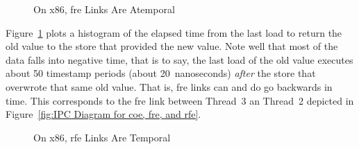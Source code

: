 \documentclass[10]{article}
\begin{document}
\begin{figure}[tb]
\begin{center}
\caption{On x86, fre Links Are Atemporal}
\label{fig:On x86, fre Links Are Atemporal}
\end{center}
\end{figure}

Figure~\ref{fig:On x86, fre Links Are Atemporal}
plots a histogram of the elapsed time from the last load to return the
old value to the store that provided the new value.
Note well that most of the data falls into negative time, that is to say,
the last load of the old value executes about 50 timestamp periods (about
20~nanoseconds) \emph{after} the store that overwrote that same old value.
That is, fre links can and do go backwards in time.
This corresponds to the fre link between Thread~3 an Thread~2 depicted in
Figure~\ref{fig:IPC Diagram for coe, fre, and rfe}.

\begin{figure}[tb]
\begin{center}
\caption{On x86, rfe Links Are Temporal}
\label{fig:On x86, rfe Links Are Temporal}
\end{center}
\end{figure}
\end{document}
